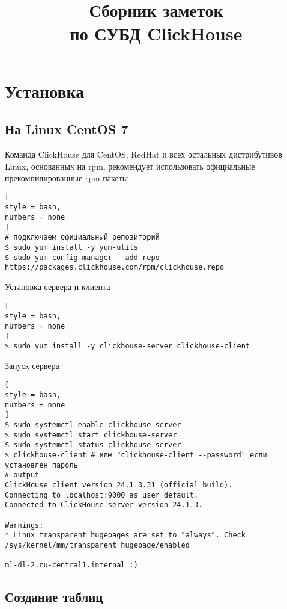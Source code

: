 \documentclass[%
	11pt,
	a4paper,
	utf8,
		]{article}
\begin{document}
\title{Сборник заметок\\по СУБД ClickHouse}

\author{}

\date{}
\maketitle

\thispagestyle{fancy}

\tableofcontents

\section{Установка}

\subsection{На Linux CentOS 7}

Команда ClickHouse для CentOS, RedHat и всех остальных дистрибутивов Linux, основанных на rpm, рекомендует использовать официальные прекомпилированные rpm-пакеты
\begin{lstlisting}[
style = bash,
numbers = none
]
# подключаем официальный репозиторий
$ sudo yum install -y yum-utils
$ sudo yum-config-manager --add-repo https://packages.clickhouse.com/rpm/clickhouse.repo
\end{lstlisting}

Установка сервера и клиента
\begin{lstlisting}[
style = bash,
numbers = none
]
$ sudo yum install -y clickhouse-server clickhouse-client
\end{lstlisting}

Запуск сервера
\begin{lstlisting}[
style = bash,
numbers = none
]
$ sudo systemctl enable clickhouse-server
$ sudo systemctl start clickhouse-server
$ sudo systemctl status clickhouse-server
$ clickhouse-client # илм "clickhouse-client --password" если установлен пароль
# output
ClickHouse client version 24.1.3.31 (official build).
Connecting to localhost:9000 as user default.
Connected to ClickHouse server version 24.1.3.

Warnings:
* Linux transparent hugepages are set to "always". Check /sys/kernel/mm/transparent_hugepage/enabled

ml-dl-2.ru-central1.internal :)
\end{lstlisting}

\subsection{Создание таблиц}
\end{document}
